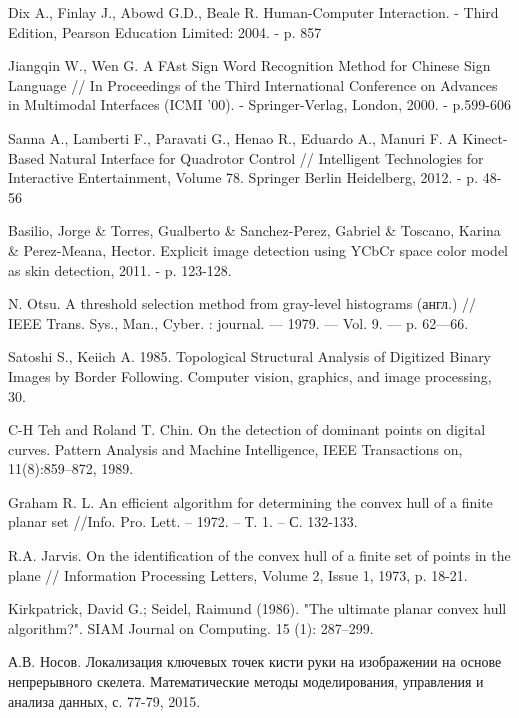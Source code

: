 \newpage
\begin{thebibliography}{99}                    %

Dix A., Finlay J., Abowd G.D., Beale R. Human-Computer Interaction. - Third Edition, Pearson
Education Limited: 2004. - p. 857

Jiangqin W., Wen G. A FAst Sign Word Recognition Method for Chinese Sign Language // In 
Proceedings of the Third International Conference on Advances in Multimodal Interfaces (ICMI 
'00). - Springer-Verlag, London, 2000. - p.599-606

Sanna A., Lamberti F., Paravati G., Henao R., Eduardo A., Manuri F. A Kinect-Based Natural
Interface for Quadrotor Control // Intelligent Technologies for Interactive Entertainment, 
Volume 78. Springer Berlin Heidelberg, 2012. - p. 48-56


Basilio, Jorge \& Torres, Gualberto \& Sanchez-Perez, Gabriel \& Toscano,
Karina \& Perez-Meana, Hector. Explicit image detection using
YCbCr space color model as skin detection, 2011. - p. 123-128. 

N. Otsu. A threshold selection method from gray-level histograms
(англ.) // IEEE Trans. Sys., Man., Cyber. : journal. — 1979. — Vol. 9.
— p. 62—66.

Satoshi S., Keiich A. 1985. Topological Structural Analysis of
Digitized Binary Images by Border Following. Computer vision, graphics,
and image processing, 30. 

C-H Teh and Roland T. Chin. On the detection of dominant points on
digital curves. Pattern Analysis and Machine Intelligence, IEEE
Transactions on, 11(8):859–872, 1989.

Graham R. L. An efficient algorithm for determining the
convex hull of a finite planar set //Info. Pro. Lett. –
1972. – Т. 1. – С. 132-133.

R.A. Jarvis. On the identification of the convex hull of a finite set of
points in the plane // Information Processing Letters, Volume 2,
Issue 1, 1973, p. 18-21.

Kirkpatrick, David G.; Seidel, Raimund (1986). "The ultimate planar
convex hull algorithm?". SIAM Journal on Computing. 15 (1): 287–299.

А.В. Носов. Локализация ключевых точек кисти руки на изображении на
основе непрерывного скелета. Математические методы моделирования,
управления и анализа данных, с. 77-79, 2015.


\end{thebibliography}
